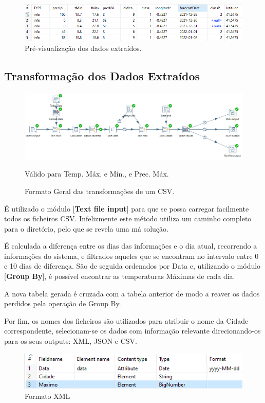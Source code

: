 \begin{figure}[H]
    \centering
    \includegraphics[scale=0.7]{imagens-spoon/previsao-preview.png}
    \caption{Pré-visualização dos dados extraídos.}
\end{figure}

\subsection*{Transformação dos Dados Extraídos}

\begin{figure}[H]
    \centering
    \includegraphics[scale=0.48]{imagens-spoon/temp-max-soon.png}
    \caption{Formato Geral das transformações de um CSV.}
    {Válido para Temp. Máx. e Mín., e Prec. Máx.}
\end{figure}

É utilizado o módulo [\textbf{Text file input}] para que se possa carregar facilmente todos os ficheiros CSV. Infelizmente este método utiliza um caminho completo para o diretório, pelo que se revela uma má solução.

É calculada a diferença entre os dias das informações e o dia atual, recorrendo a informações do sistema, e filtrados aqueles que se encontram no intervalo entre 0 e 10 dias de diferença. São de seguida ordenados por Data e, utilizando o módulo [\textbf{Group By}], é possível encontrar as temperaturas Máximas de cada dia. 

A nova tabela gerada é cruzada com a tabela anterior de modo a reaver os dados perdidos pela operação de Group By.

Por fim, os nomes dos ficheiros são utilizados para atribuir o nome da Cidade correspondente, selecionam-se os dados com informação relevante direcionando-os para os seus outputs: XML, JSON e CSV.

\begin{figure}[H]
    \centering
    \includegraphics{imagens-spoon/output-pattern.png}
    \caption{Formato XML}
\end{figure}

